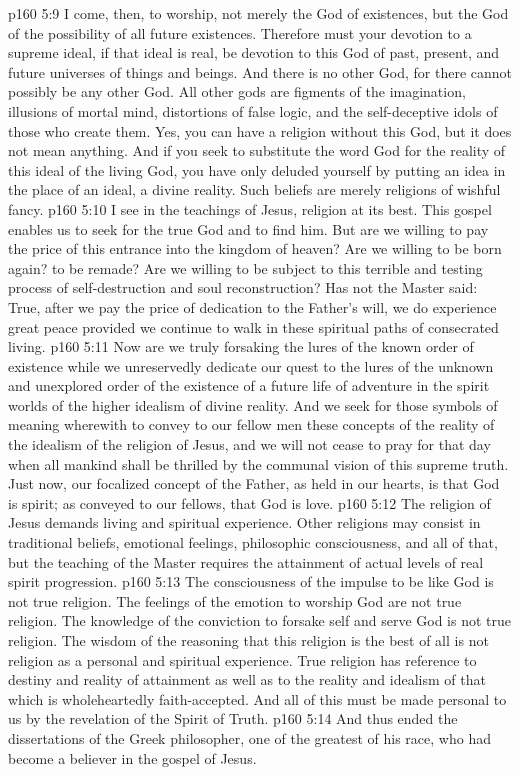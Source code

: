 \vs p160 5:9 I come, then, to worship, not merely the God of existences, but the God of the possibility of all future existences. Therefore must your devotion to a supreme ideal, if that ideal is real, be devotion to this God of past, present, and future universes of things and beings. And there is no other God, for there cannot possibly be any other God. All other gods are figments of the imagination, illusions of mortal mind, distortions of false logic, and the self\hyp{}deceptive idols of those who create them. Yes, you can have a religion without this God, but it does not mean anything. And if you seek to substitute the word God for the reality of this ideal of the living God, you have only deluded yourself by putting an idea in the place of an ideal, a divine reality. Such beliefs are merely religions of wishful fancy.
\vs p160 5:10 I see in the teachings of Jesus, religion at its best. This gospel enables us to seek for the true God and to find him. But are we willing to pay the price of this entrance into the kingdom of heaven? Are we willing to be born again? to be remade? Are we willing to be subject to this terrible and testing process of self\hyp{}destruction and soul reconstruction? Has not the Master said:  True, after we pay the price of dedication to the Father’s will, we do experience great peace provided we continue to walk in these spiritual paths of consecrated living.
\vs p160 5:11 Now are we truly forsaking the lures of the known order of existence while we unreservedly dedicate our quest to the lures of the unknown and unexplored order of the existence of a future life of adventure in the spirit worlds of the higher idealism of divine reality. And we seek for those symbols of meaning wherewith to convey to our fellow men these concepts of the reality of the idealism of the religion of Jesus, and we will not cease to pray for that day when all mankind shall be thrilled by the communal vision of this supreme truth. Just now, our focalized concept of the Father, as held in our hearts, is that God is spirit; as conveyed to our fellows, that God is love.
\vs p160 5:12 The religion of Jesus demands living and spiritual experience. Other religions may consist in traditional beliefs, emotional feelings, philosophic consciousness, and all of that, but the teaching of the Master requires the attainment of actual levels of real spirit progression.
\vs p160 5:13 The consciousness of the impulse to be like God is not true religion. The feelings of the emotion to worship God are not true religion. The knowledge of the conviction to forsake self and serve God is not true religion. The wisdom of the reasoning that this religion is the best of all is not religion as a personal and spiritual experience. True religion has reference to destiny and reality of attainment as well as to the reality and idealism of that which is wholeheartedly faith\hyp{}accepted. And all of this must be made personal to us by the revelation of the Spirit of Truth.
\vs p160 5:14 \pc And thus ended the dissertations of the Greek philosopher, one of the greatest of his race, who had become a believer in the gospel of Jesus.
\quizlink
